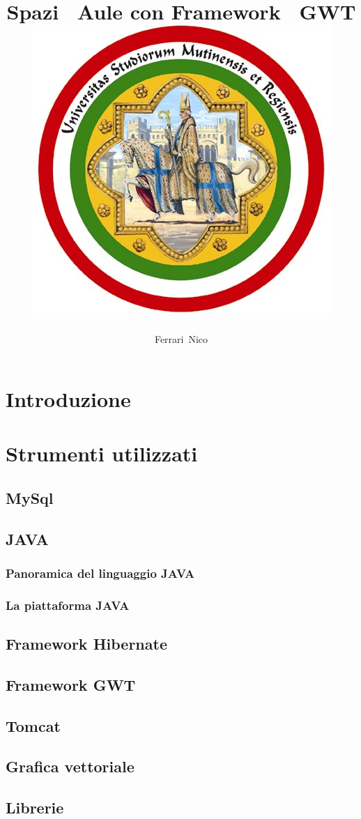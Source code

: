\documentclass[a4paper,pt11,oneside]{book}
\title{
\huge
\textbf{Spazi ~Aule con Framework ~GWT}\\
{\includegraphics[scale=2]{university.jpg}}}
\author{Ferrari~Nico}
\begin{document}
\maketitle
\renewcommand{\contentsname}{Indice}
\tableofcontents
\listoffigures
\listoftables

\chapter{Introduzione}


\chapter{Strumenti utilizzati}
\section{MySql}

\section{JAVA}

\subsection{Panoramica del linguaggio JAVA}

\subsection{La piattaforma JAVA}

\section{Framework Hibernate}

\section{Framework GWT}

\section{Tomcat}

\section{Grafica vettoriale}

\section{Librerie}

\end{document}
